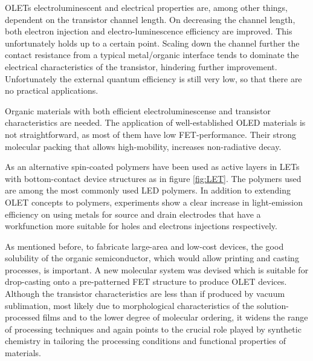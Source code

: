 OLETs electroluminescent and electrical properties are, among other things, dependent on the transistor channel length. On decreasing the channel length, both electron injection and electro-luminescence efficiency are improved. This unfortunately holds up to a certain point. Scaling down the channel further the contact resistance from a typical metal/organic interface tends to dominate the electrical characteristics of the transistor, hindering further improvement. Unfortunately the external quantum efficiency is still very low, so that there are no practical applications. 

Organic materials with both efficient electroluminescense and transistor characteristics are needed. The application of well-established OLED materials is not straightforward, as most of them have low FET-performance. Their strong molecular packing that allows high-mobility, increases non-radiative decay.

As an alternative spin-coated polymers have been used as active layers in LETs with bottom-contact device structures as in figure \ref{fig:LET}. The polymers used are among the most commonly used LED polymers. In addition to extending OLET concepts to polymers, experiments show a clear increase in light-emission efficiency on using metals for source and drain electrodes that have a workfunction more suitable for holes and electrons injections respectively.

As mentioned before, to fabricate large-area and low-cost devices, the good solubility of the organic semiconductor, which would allow printing and casting processes, is important. A new molecular system was devised which is suitable for drop-casting onto a pre-patterned FET structure to produce OLET devices. Although the transistor characteristics are less than if produced by vacuum sublimation, most likely due to morphological characteristics of the solution-processed films and to the lower degree of molecular ordering, it widens the range of processing techniques and again points to the crucial role played by synthetic chemistry in tailoring the processing conditions and functional properties of materials.